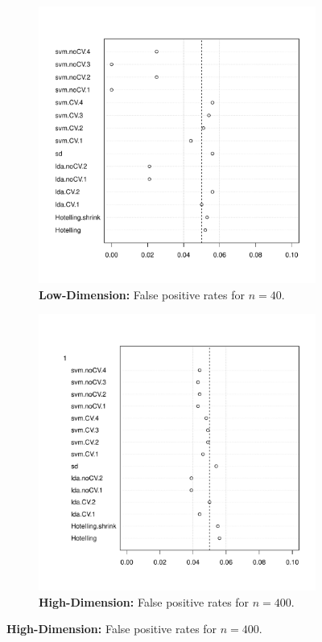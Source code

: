 \documentclass[12pt,a4paper]{article}
\newcommand{\mycaption}{Simulation details in Appendix~\ref{apx:simulation_details} except the changes in the sub-captions.}
\begin{document}
\begin{figure}[h]
\centering
\caption{\mycaption}	
\label{fig:large_sample}
	\begin{subfigure}{.5\textwidth}
	  \centering
	  \includegraphics[width=1\linewidth]{"art/2016-07-27 11:42:05zoom"}
	  \caption{\textbf{Low-Dimension:} False positive rates for $n=40$.} 
	\label{fig:large_sample_1}
	\end{subfigure}%
	\begin{subfigure}{.5\textwidth}
	  \centering
	  \includegraphics[width=1\linewidth]{"art/2016-08-04 13:59:33zoom"}
	  \caption{\textbf{High-Dimension:} False positive rates for $n=400$.} 
	\label{fig:large_sample_2}
	\end{subfigure}
\end{figure}
\end{document}

